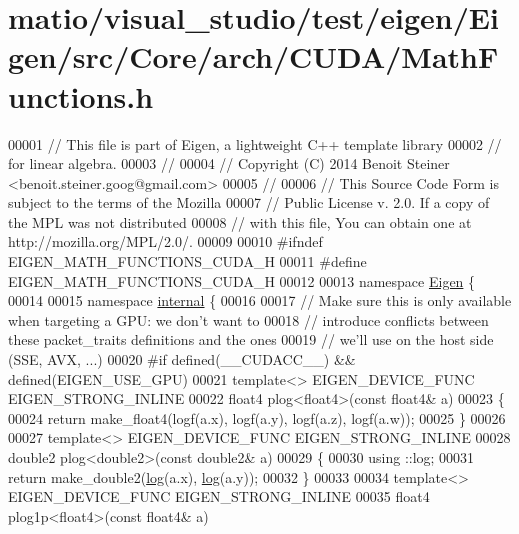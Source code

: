 \hypertarget{matio_2visual__studio_2test_2eigen_2_eigen_2src_2_core_2arch_2_c_u_d_a_2_math_functions_8h_source}{}\section{matio/visual\+\_\+studio/test/eigen/\+Eigen/src/\+Core/arch/\+C\+U\+D\+A/\+Math\+Functions.h}
\label{matio_2visual__studio_2test_2eigen_2_eigen_2src_2_core_2arch_2_c_u_d_a_2_math_functions_8h_source}

\begin{DoxyCode}
00001 \textcolor{comment}{// This file is part of Eigen, a lightweight C++ template library}
00002 \textcolor{comment}{// for linear algebra.}
00003 \textcolor{comment}{//}
00004 \textcolor{comment}{// Copyright (C) 2014 Benoit Steiner <benoit.steiner.goog@gmail.com>}
00005 \textcolor{comment}{//}
00006 \textcolor{comment}{// This Source Code Form is subject to the terms of the Mozilla}
00007 \textcolor{comment}{// Public License v. 2.0. If a copy of the MPL was not distributed}
00008 \textcolor{comment}{// with this file, You can obtain one at http://mozilla.org/MPL/2.0/.}
00009 
00010 \textcolor{preprocessor}{#ifndef EIGEN\_MATH\_FUNCTIONS\_CUDA\_H}
00011 \textcolor{preprocessor}{#define EIGEN\_MATH\_FUNCTIONS\_CUDA\_H}
00012 
00013 \textcolor{keyword}{namespace }\hyperlink{namespace_eigen}{Eigen} \{
00014 
00015 \textcolor{keyword}{namespace }\hyperlink{namespaceinternal}{internal} \{
00016 
00017 \textcolor{comment}{// Make sure this is only available when targeting a GPU: we don't want to}
00018 \textcolor{comment}{// introduce conflicts between these packet\_traits definitions and the ones}
00019 \textcolor{comment}{// we'll use on the host side (SSE, AVX, ...)}
00020 \textcolor{preprocessor}{#if defined(\_\_CUDACC\_\_) && defined(EIGEN\_USE\_GPU)}
00021 \textcolor{keyword}{template}<> EIGEN\_DEVICE\_FUNC EIGEN\_STRONG\_INLINE
00022 float4 plog<float4>(\textcolor{keyword}{const} float4& a)
00023 \{
00024   \textcolor{keywordflow}{return} make\_float4(logf(a.x), logf(a.y), logf(a.z), logf(a.w));
00025 \}
00026 
00027 \textcolor{keyword}{template}<>  EIGEN\_DEVICE\_FUNC EIGEN\_STRONG\_INLINE
00028 double2 plog<double2>(\textcolor{keyword}{const} double2& a)
00029 \{
00030   using ::log;
00031   \textcolor{keywordflow}{return} make\_double2(\hyperlink{structlog}{log}(a.x), \hyperlink{structlog}{log}(a.y));
00032 \}
00033 
00034 \textcolor{keyword}{template}<> EIGEN\_DEVICE\_FUNC EIGEN\_STRONG\_INLINE
00035 float4 plog1p<float4>(\textcolor{keyword}{const} float4& a)

\end{DoxyCode}
